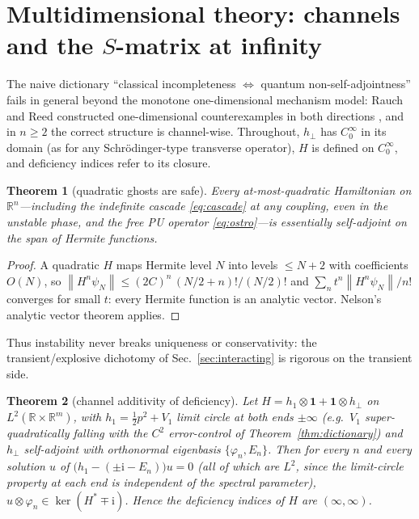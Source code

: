 \documentclass[11pt]{article}
\newtheorem{theorem}{Theorem}[section]
\theoremstyle{definition}
\theoremstyle{remark}
\newcommand{\ii}{\mathrm{i}}
\newcommand{\esa}{essentially self-adjoint}
\newcommand{\norm}[1]{\left\lVert #1 \right\rVert}
\begin{document}
\section{Multidimensional theory: channels and the \texorpdfstring{$S$}{S}-matrix at infinity}
\label{sec:multiD}

The naive dictionary ``classical incompleteness
$\Leftrightarrow$ quantum non-self-adjointness'' fails in general
beyond the monotone one-dimensional mechanism model: Rauch and Reed
constructed one-dimensional counterexamples in both directions
\cite{RauchReed1973}, and in $n\ge2$ the correct structure is
channel-wise. Throughout,
$h_{\perp}$ has $C_0^{\infty}$ in its domain (as for any Schr\"odinger-type
transverse operator), $H$ is defined on $C_0^{\infty}$, and deficiency indices refer to its
closure.

\begin{theorem}[quadratic ghosts are safe]
\label{thm:quadratic}
Every at-most-quadratic Hamiltonian on $\mathbb R^{n}$---including the
indefinite cascade \eqref{eq:cascade} at any coupling, even in the
unstable phase, and the free PU operator \eqref{eq:ostro}---is \esa{} on
the span of Hermite functions.
\end{theorem}

\begin{proof}
A quadratic $H$ maps Hermite level $N$ into levels $\le N+2$ with
coefficients $O(N)$, so
$\norm{H^{n}\psi_N}\le(2C)^{n}\,(N/2+n)!/(N/2)!$
and $\sum_n t^{n}\norm{H^{n}\psi_N}/n!$ converges for small $t$: every
Hermite function is an analytic vector. Nelson's analytic vector theorem
\cite{Nelson1959} applies.
\end{proof}

Thus instability never breaks uniqueness or conservativity: the
transient/explosive dichotomy of Sec.~\ref{sec:interacting} is rigorous on
the transient side.

\begin{theorem}[channel additivity of deficiency]
\label{thm:channels}
Let $H=h_1\otimes\mathbf 1+\mathbf 1\otimes h_{\perp}$ on
$L^{2}(\mathbb R\times\mathbb R^{m})$, with $h_1=\tfrac12p^{2}+V_1$
limit circle at both ends $\pm\infty$ (e.g.\ $V_1$ super-quadratically
falling with the $C^{2}$ error-control of Theorem~\ref{thm:dictionary})
and $h_{\perp}$ self-adjoint
with orthonormal eigenbasis $\{\varphi_n,E_n\}$. Then for every $n$ and
every solution $u$ of $\bigl(h_1-(\pm\ii-E_n)\bigr)u=0$ (all of which are
$L^{2}$, since the limit-circle property at each end is independent of
the spectral
parameter), $u\otimes\varphi_n\in\ker(H^{*}\mp\ii)$. Hence the deficiency
indices of $H$ are $(\infty,\infty)$.
\end{theorem}
\end{document}
